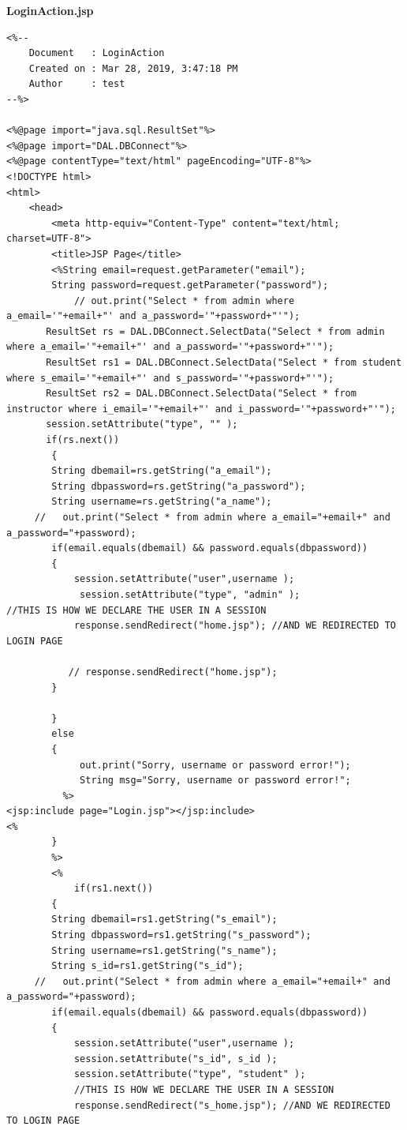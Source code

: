 {\bf LoginAction.jsp}
\begin{lstlisting}
<%-- 
    Document   : LoginAction
    Created on : Mar 28, 2019, 3:47:18 PM
    Author     : test
--%>

<%@page import="java.sql.ResultSet"%>
<%@page import="DAL.DBConnect"%>
<%@page contentType="text/html" pageEncoding="UTF-8"%>
<!DOCTYPE html>
<html>
    <head>
        <meta http-equiv="Content-Type" content="text/html; charset=UTF-8">
        <title>JSP Page</title>
        <%String email=request.getParameter("email");
        String password=request.getParameter("password");
            // out.print("Select * from admin where a_email='"+email+"' and a_password='"+password+"'");
       ResultSet rs = DAL.DBConnect.SelectData("Select * from admin where a_email='"+email+"' and a_password='"+password+"'");
       ResultSet rs1 = DAL.DBConnect.SelectData("Select * from student where s_email='"+email+"' and s_password='"+password+"'");
       ResultSet rs2 = DAL.DBConnect.SelectData("Select * from instructor where i_email='"+email+"' and i_password='"+password+"'");
       session.setAttribute("type", "" ); 
       if(rs.next())
        { 
        String dbemail=rs.getString("a_email");
        String dbpassword=rs.getString("a_password");
        String username=rs.getString("a_name");
     //   out.print("Select * from admin where a_email="+email+" and a_password="+password);
        if(email.equals(dbemail) && password.equals(dbpassword))
        {
            session.setAttribute("user",username );
             session.setAttribute("type", "admin" );
//THIS IS HOW WE DECLARE THE USER IN A SESSION
			response.sendRedirect("home.jsp"); //AND WE REDIRECTED TO LOGIN PAGE
			
           // response.sendRedirect("home.jsp");
        }
        
        }
        else 
        {
             out.print("Sorry, username or password error!");
             String msg="Sorry, username or password error!";
          %>  
<jsp:include page="Login.jsp"></jsp:include>  
<%  
        } 
        %>
        <% 
            if(rs1.next())
        { 
        String dbemail=rs1.getString("s_email");
        String dbpassword=rs1.getString("s_password");
        String username=rs1.getString("s_name");
        String s_id=rs1.getString("s_id");
     //   out.print("Select * from admin where a_email="+email+" and a_password="+password);
        if(email.equals(dbemail) && password.equals(dbpassword))
        {
            session.setAttribute("user",username );
            session.setAttribute("s_id", s_id ); 
            session.setAttribute("type", "student" );
            //THIS IS HOW WE DECLARE THE USER IN A SESSION
            response.sendRedirect("s_home.jsp"); //AND WE REDIRECTED TO LOGIN PAGE
			

\end{lstlisting}
